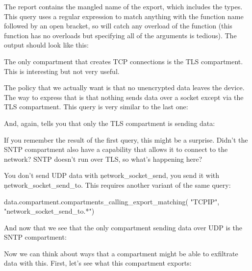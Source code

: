 {The report contains the mangled name of the export, which includes the types.
This query uses a regular expression to match anything with the function name followed by an open bracket, so will catch any overload of the function (this function has no overloads but specifying all of the arguments is tedious).
The output should look like this:

\begin{jsonsnippet}
[
  "TLS"
]
\end{jsonsnippet}

The only compartment that creates TCP connections is the TLS compartment.
This is interesting but not very useful.

The policy that we actually want is that no unencrypted data leaves the device.
The way to express that is that nothing sends data over a socket except via the TLS compartment.
This query is very similar to the last one:


And, again, tells you that only the TLS compartment is sending data:

\begin{jsonsnippet}
[
  "TLS"
]
\end{jsonsnippet}

If you remember the result of the first query, this might be a surprise.
Didn't the SNTP compartment also have a capability that allows it to connect to the network?
SNTP doesn't run over TLS, so what's happening here?

You don't send UDP data with \c{network_socket_send}, you send it with \c{network_socket_send_to}.
This requires another variant of the same query:

\begin{regosnippet}
data.compartment.compartments_calling_export_matching(
	"TCPIP",
	"network_socket_send_to.*") 
\end{regosnippet}

And now that we see that the only compartment sending data over UDP is the SNTP compartment:

\begin{jsonsnippet}
[
  "SNTP"
]
\end{jsonsnippet}

Now we can think about ways that a compartment might be able to exfiltrate data with this.
First, let's see what this compartment exports:

}
